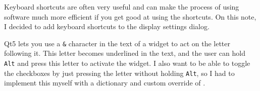 \documentclass[../development.tex]{subfiles}
\begin{document}
Keyboard shortcuts are often very useful and can make the process of using software much more efficient if you get good at using the shortcuts. On this note, I decided to add keyboard shortcuts to the display settings dialog.

Qt5 lets you use a \texttt{\&} character in the text of a widget to act on the letter following it. This letter becomes underlined in the text, and the user can hold \texttt{Alt} and press this letter to activate the widget. I also want to be able to toggle the checkboxes by just pressing the letter without holding \texttt{Alt}, so I had to implement this myself with a dictionary and custom override of .

\end{document}
